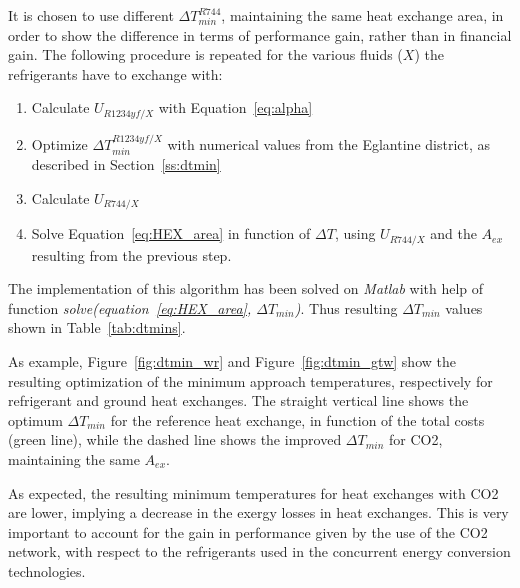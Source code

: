 \documentclass{article}
\begin{document}
It is chosen to use different $\Delta T_{min}^{R744}$, maintaining the same heat exchange area, in order to show the difference in terms of performance gain, rather than in financial gain. The following procedure is repeated for the various fluids ($X$) the refrigerants have to exchange with:
\begin{enumerate}
	\item Calculate $U_{R1234yf/X}$ with Equation~\ref{eq:alpha}
	\item Optimize $\Delta T_{min}^{R1234yf/X}$ with numerical values from the Eglantine district, as described in Section~\ref{ss:dtmin}
	\item Calculate  $U_{R744/X}$ 
	\item Solve Equation~\ref{eq:HEX_area} in function of $\Delta T$, using $U_{R744/X}$ and the $A_{ex}$ resulting from the previous step.
\end{enumerate}

The implementation of this algorithm has been solved on \textit{Matlab} with help of function \textit{solve(equation~\ref{eq:HEX_area}, $\Delta T_{min}$)}.
Thus resulting $\Delta T_{min}$ values shown in Table~\ref{tab:dtmins}.



As example, Figure~\ref{fig:dtmin_wr} and Figure~\ref{fig:dtmin_gtw} show the resulting optimization of the minimum approach temperatures, respectively for refrigerant and ground heat exchanges. The straight vertical line shows the optimum $\Delta T_{min}$ for the reference heat exchange, in function of the total costs (green line), while the dashed line shows the improved $\Delta T_{min}$ for CO2, maintaining the same $A_{ex}$.

As expected, the resulting minimum temperatures for heat exchanges with CO2 are lower, implying a decrease in the exergy losses in heat exchanges. This is very important to account for the gain in performance given by the use of the CO2 network, with respect to the refrigerants used in the concurrent energy conversion technologies.
\end{document}
